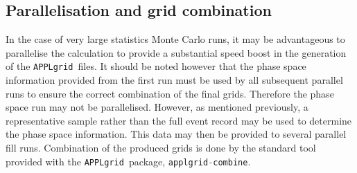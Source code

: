 \documentclass[11pt]{article}
\newcommand{\appl} {{\tt APPLgrid }}
\begin{document}
\subsection{Parallelisation and grid combination} 
In the case of very large statistics Monte Carlo runs, it may be advantageous to parallelise the calculation to provide a substantial speed boost in the generation of the \appl files. It should be noted however that the phase space information provided from the first run must be used by all subsequent parallel runs to ensure the correct combination of the final grids. Therefore the phase space run may not be parallelised. However, as mentioned previously, a representative sample rather than the full event record may be used to determine the phase space information. This data may then be provided to several parallel fill runs. Combination of the produced grids is done by the standard tool provided with the \appl package, \lstinline[language=c++]{applgrid-combine}.
\end{document}
